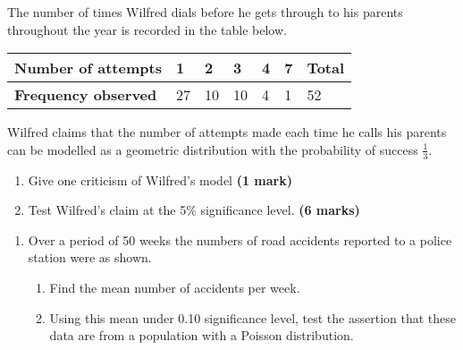 \documentclass[fleqn]{article}
\begin{document}
\begin{enumerate}
        The number of times Wilfred dials before he gets through to his parents throughout the year is recorded in the table below.\vspace{-1mm}
        \begin{center}
            \begin{tabularx}{0.75\textwidth}{|X|*6{P{12mm}|}}
                \hline
                \textbf{Number of attempts} & 1  & 2  & 3  & 4 & 7 & \textbf{Total}  \\\hline
                \textbf{Frequency observed} & 27 & 10 & 10 & 4 & 1 & 52              \\\hline
            \end{tabularx}
        \end{center}\vspace{3mm}
        Wilfred claims that the number of attempts made each time he calls his parents can be modelled as a geometric distribution with the probability of success $\frac{1}{3}$.
        \begin{enumerate}[label=\bfseries \alph*\space ]
            \item Give one criticism of Wilfred's model \hfill\textbf{(1 mark)}
            \item Test Wilfred's claim at the 5\% significance level. \hfill\textbf{(6 marks)}
        \end{enumerate}
\end{enumerate}
\newpage

\exercise{}
\begin{enumerate}
    \item Over a period of 50 weeks the numbers of road accidents reported to a police station were as shown.
    \begin{enumerate}[label=\bfseries \alph*\space ]
        \item Find the mean number of accidents per week.
        \item Using this mean under 0.10 significance level, test the assertion that these data are from a population with a Poisson distribution.
    \end{enumerate}
\end{enumerate}



\newpage
{}
\end{document}
